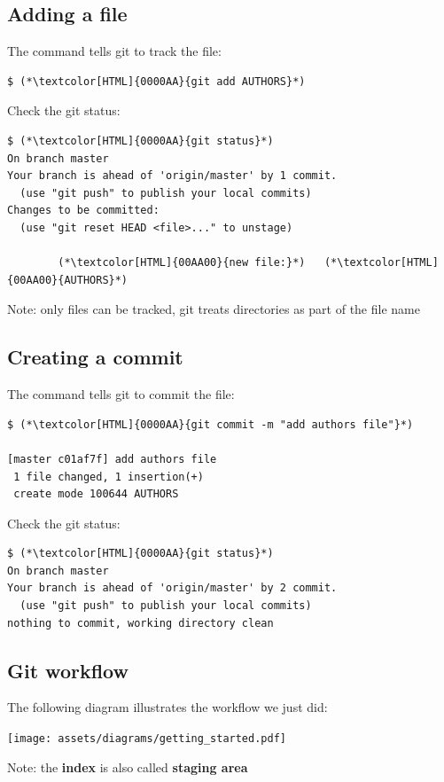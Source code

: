\subsection{Adding a file}
\begin{frame}[fragile]
  \subslidetitle

  The command  tells git to track the file:
  \begin{lstlisting}
$ (*\textcolor[HTML]{0000AA}{git add AUTHORS}*)
\end{lstlisting}

  Check the git status:
  \begin{lstlisting}
$ (*\textcolor[HTML]{0000AA}{git status}*)
On branch master
Your branch is ahead of 'origin/master' by 1 commit.
  (use "git push" to publish your local commits)
Changes to be committed:
  (use "git reset HEAD <file>..." to unstage)

        (*\textcolor[HTML]{00AA00}{new file:}*)   (*\textcolor[HTML]{00AA00}{AUTHORS}*)
\end{lstlisting}

  \vspace{1em}
  Note: only files can be tracked, git treats directories as part of the file name
\end{frame}


\subsection{Creating a commit}
\begin{frame}[fragile]
  \subslidetitle

  The command  tells git to commit the file:
  \begin{lstlisting}
$ (*\textcolor[HTML]{0000AA}{git commit -m "add authors file"}*)

[master c01af7f] add authors file
 1 file changed, 1 insertion(+)
 create mode 100644 AUTHORS
\end{lstlisting}

  Check the git status:
  \begin{lstlisting}
$ (*\textcolor[HTML]{0000AA}{git status}*)
On branch master
Your branch is ahead of 'origin/master' by 2 commit.
  (use "git push" to publish your local commits)
nothing to commit, working directory clean
\end{lstlisting}
\end{frame}

\subsection{Git workflow}
\begin{frame}[fragile]
  \subslidetitle
  The following diagram illustrates the workflow we just did: \\
  \vspace{2em}
  \centerline{\texttt{[image: assets/diagrams/getting\_started.pdf]}}

  \vspace{1em}
  Note: the \textbf{index} is also called \textbf{staging area}
\end{frame}


